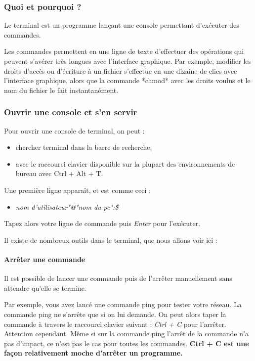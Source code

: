 \subsubsection{Quoi et pourquoi ?}
Le terminal est un programme lançant une console permettant d'exécuter des
commandes.

Les commandes permettent en une ligne de texte d'effectuer des
opérations qui peuvent s'avérer très longues avec l'interface graphique. Par
exemple, modifier les droits d'accès ou d'écriture à un fichier s'effectue en
une dizaine de clics avec l'interface graphique, alors que la commande *chmod*
avec les droits voulus et le nom du fichier le fait instantanément.

\subsubsection{Ouvrir une console et s'en servir}
Pour ouvrir une console de terminal, on peut :

\begin{itemize}
\item chercher terminal dans la barre de recherche;
\item avec le raccourci clavier disponible sur la plupart des environnements de
bureau avec Ctrl + Alt + T.
\end{itemize}

Une première ligne apparaît, et est comme ceci :

\begin{itemize}
\item \textit{nom d'utilisateur"@"nom du pc":\~\$}
\end{itemize}

Tapez alors votre ligne de commande puis \textit{Enter} pour l'exécuter.\newline

Il existe de nombreux outils dans le terminal, que nous allons voir ici :
\paragraph{Arrêter une commande}

Il est possible de lancer une commande puis de l'arrêter manuellement sans
attendre qu'elle se termine.

Par exemple, vous avez lancé une commande ping pour tester votre réseau. La
commande ping ne s'arrête que si on lui demande. On peut alors taper la commande
à travers le raccourci clavier suivant : \textit{Ctrl + C} pour l'arrêter.
Attention cependant. Même si sur la commande ping l'arrêt de la commande n'a pas
d'impact, ce n'est pas le cas pour toutes les commandes. \textbf{Ctrl + C est
une façon relativement moche d'arrêter un programme.}

